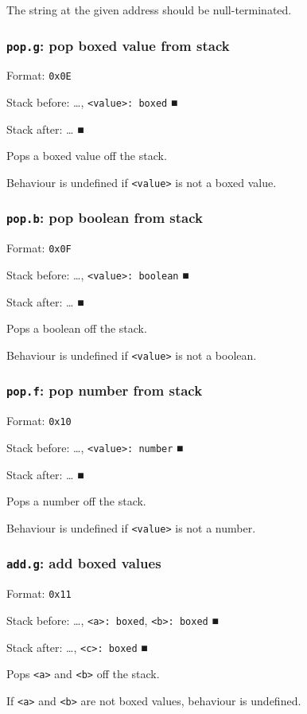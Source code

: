 \documentclass[11pt]{article}
\begin{document}
The string at the given address should be null-terminated.

\subsubsection{\texttt{pop.g}: pop boxed value from stack}
\label{sec:org5cb332a}
Format: \texttt{0x0E}

Stack before: \ldots{}​, \texttt{<value>: boxed} ■

Stack after: \ldots{}​ ■

Pops a boxed value off the stack.

Behaviour is undefined if \texttt{<value>} is not a boxed value.

\subsubsection{\texttt{pop.b}: pop boolean from stack}
\label{sec:org55a65aa}
Format: \texttt{0x0F}

Stack before: \ldots{}​, \texttt{<value>: boolean} ■

Stack after: \ldots{}​ ■

Pops a boolean off the stack.

Behaviour is undefined if \texttt{<value>} is not a boolean.

\subsubsection{\texttt{pop.f}: pop number from stack}
\label{sec:orgf652769}
Format: \texttt{0x10}

Stack before: \ldots{}​, \texttt{<value>: number} ■

Stack after: \ldots{}​ ■

Pops a number off the stack.

Behaviour is undefined if \texttt{<value>} is not a number.

\subsubsection{\texttt{add.g}: add boxed values}
\label{sec:orgd3666a0}
Format: \texttt{0x11}

Stack before: \ldots{}​, \texttt{<a>: boxed}, \texttt{<b>: boxed} ■

Stack after: \ldots{}​, \texttt{<c>: boxed} ■

Pops \texttt{<a>} and \texttt{<b>} off the stack.

If \texttt{<a>} and \texttt{<b>} are not boxed values, behaviour is undefined.
\end{document}
